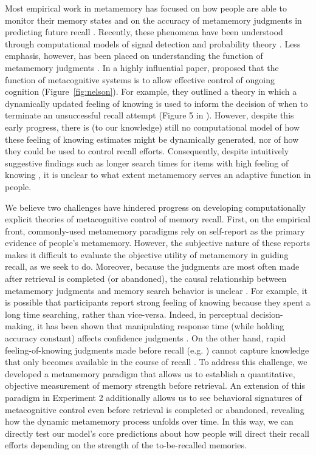 Most empirical work in metamemory has focused on how people are able to monitor their memory states \citep{reder1992determines,miner1994new,eakin2005illusions} and on the accuracy of metamemory judgments in predicting future recall \citep{hart1965memory,vesonder1985ability,dunlosky1992importance,dunlosky2007metacomprehension}. Recently, these phenomena have been understood through computational models of signal detection \citep{jang2012stochastic} and probability theory \citep{hu2021bayesian}. Less emphasis, however, has been placed on understanding the function of metamemory judgments \citep{schwartz2017metamemory}. In a highly influential paper, \citetnelson{} proposed that the function of metacognitive systems is to allow effective control of ongoing cognition (Figure~\ref{fig:nelson}). For example, they outlined a theory in which a dynamically updated feeling of knowing is used to inform the decision of when to terminate an unsuccessful recall attempt (Figure 5 in \citealpnelson{}). However, despite this early progress, there is (to our knowledge) still no computational model of how these feeling of knowing estimates might be dynamically generated, nor of how they could be used to control recall efforts. Consequently, despite intuitively suggestive findings such as longer search times for items with high feeling of knowing \citep{nelson1984comparison,nhouyvanisvong1998rapid,gruneberg1977methodological,lachman1979metamemory}, it is unclear to what extent metamemory serves an adaptive function in people.

We believe two challenges have hindered progress on developing computationally explicit theories of metacognitive control of memory recall. First, on the empirical front, commonly-used metamemory paradigms rely on self-report as the primary evidence of people's metamemory. However, the subjective nature of these reports makes it difficult to evaluate the objective utility of metamemory in guiding recall, as we seek to do. Moreover, because the judgments are most often made after retrieval is completed (or abandoned), the causal relationship between metamemory judgments and memory search behavior is unclear \citep{schwartz2001relation}. For example, it is possible that participants report strong feeling of knowing because they spent a long time searching, rather than vice-versa. Indeed, in perceptual decision-making, it has been shown that manipulating response time (while holding accuracy constant) affects confidence judgments \citep{kiani2014choice}. On the other hand, rapid feeling-of-knowing judgments made before recall (e.g. \citealp{reder1987strategy}) cannot capture knowledge that only becomes available in the course of recall \citep{koriat1993how,nhouyvanisvong1998rapid}. To address this challenge, we developed a metamemory paradigm that allows us to establish a quantitative, objective measurement of memory strength before retrieval. An extension of this paradigm in Experiment 2 additionally allows us to see behavioral signatures of metacognitive control even before retrieval is completed or abandoned, revealing how the dynamic metamemory process unfolds over time. In this way, we can directly test our model's core predictions about how people will direct their recall efforts depending on the strength of the to-be-recalled memories.


